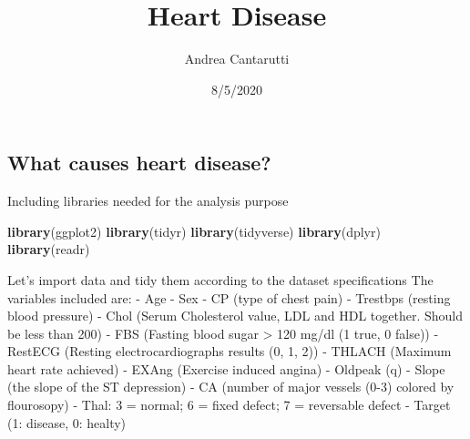 \documentclass[
]{article}
\title{Heart Disease}
\author{Andrea Cantarutti}
\date{8/5/2020}
\newenvironment{Shaded}{\begin{snugshade}}{\end{snugshade}}
\newcommand{\KeywordTok}[1]{\textcolor[rgb]{0.13,0.29,0.53}{\textbf{#1}}}
\newcommand{\NormalTok}[1]{#1}
\begin{document}
\maketitle

\hypertarget{what-causes-heart-disease}{%
\subsection{What causes heart
disease?}\label{what-causes-heart-disease}}

Including libraries needed for the analysis purpose

\begin{Shaded}
\begin{Highlighting}[]
\KeywordTok{library}\NormalTok{(ggplot2)}
\KeywordTok{library}\NormalTok{(tidyr)}
\KeywordTok{library}\NormalTok{(tidyverse)}
\KeywordTok{library}\NormalTok{(dplyr)}
\KeywordTok{library}\NormalTok{(readr)}
\end{Highlighting}
\end{Shaded}

Let's import data and tidy them according to the dataset specifications
The variables included are: - Age - Sex - CP (type of chest pain) -
Trestbps (resting blood pressure) - Chol (Serum Cholesterol value, LDL
and HDL together. Should be less than 200) - FBS (Fasting blood sugar
\textgreater{} 120 mg/dl (1 true, 0 false)) - RestECG (Resting
electrocardiographs results (0, 1, 2)) - THLACH (Maximum heart rate
achieved) - EXAng (Exercise induced angina) - Oldpeak (q) - Slope (the
slope of the ST depression) - CA (number of major vessels (0-3) colored
by flourosopy) - Thal: 3 = normal; 6 = fixed defect; 7 = reversable
defect - Target (1: disease, 0: healty)
\end{document}
